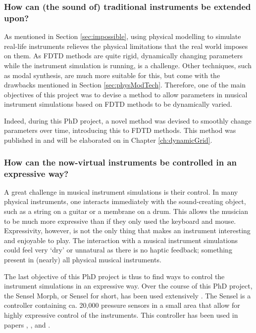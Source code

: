 \subsubsection{How can (the sound of) traditional instruments be extended upon?}
As mentioned in Section \ref{sec:impossible}, using physical modelling to simulate real-life instruments relieves the physical limitations that the real world imposes on them.
As FDTD methods are quite rigid, dynamically changing parameters while the instrument simulation is running, is a challenge. Other techniques, such as modal synthesis, are much more suitable for this, but come with the drawbacks mentioned in Section \ref{sec:physModTech}. Therefore, one of the main objectives of this project was to devise a method to allow parameters in musical instrument simulations based on FDTD methods to be dynamically varied.

Indeed, during this PhD project, a novel method was devised to smoothly change parameters over time, introducing this to FDTD methods. This method was published in \citeP[G] and will be elaborated on in Chapter \ref{ch:dynamicGrid}.

\subsubsection{How can the now-virtual instruments be controlled in an expressive way?}
A great challenge in musical instrument simulations is their control. In many physical instruments, one interacts immediately with the sound-creating object, such as a string on a guitar or a membrane on a drum. This allows the musician to be much more expressive than if they only used the keyboard and mouse. 
Expressivity, however, is not the only thing that makes an instrument interesting and enjoyable to play. The interaction with a musical instrument simulations could feel very `dry' or unnatural as there is no haptic feedback; something present in (nearly) all physical musical instruments. 

The last objective of this PhD project is thus to find ways to control the instrument simulations in an expressive way. 
Over the course of this PhD project, the Sensel Morph, or Sensel for short, has been used extensively  \cite{sensel}. The Sensel is a controller containing ca. 20,000 pressure sensors in a small area that allow for highly expressive control of the instruments. This controller has been used in papers \citeP[A], \citeP[B], \citeP[C] and \citeP[D].

